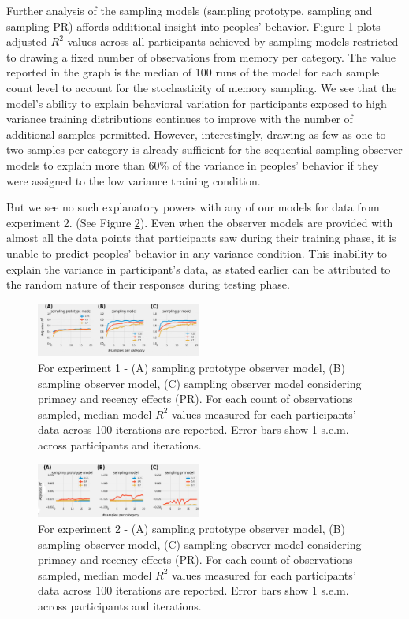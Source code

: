 \documentclass[10pt,letterpaper]{article}
\begin{document}
Further analysis of the sampling models (sampling prototype, sampling and sampling PR) affords additional insight into peoples' behavior. Figure \ref{fig:meta_r2_performance_upd} plots adjusted $R^2$ values across all participants achieved by sampling models restricted to drawing a fixed number of observations from memory per category. The value reported in the graph is the median of 100 runs of the model for each sample count level to account for the stochasticity of memory sampling. We see that the model's ability to explain behavioral variation for participants exposed to high variance training distributions continues to improve with the number of additional samples permitted. However, interestingly, drawing as few as one to two samples per category is already sufficient for the sequential sampling observer models to explain more than 60\% of the variance in peoples' behavior if they were assigned to the low variance training condition.   


But we see no such explanatory powers with any of our models for data from experiment 2. (See Figure \ref{fig:meta_r2_performance_upd2}). Even when the observer models are provided with almost all the data points that participants saw during their training phase, it is unable to predict peoples' behavior in any variance condition. This inability to explain the variance in participant's data, as stated earlier can be attributed to the random nature of their responses during testing phase.

\begin{figure}[h!]
    \centering
    \includegraphics[width=0.48\textwidth]{results/meta_r2_performance_itr_upd.pdf}
    \caption{For experiment 1 - (A) sampling prototype observer model, (B) sampling observer model, (C) sampling observer model considering primacy and recency effects (PR). For each count of observations sampled, median model $R^2$ values measured for each participants' data across 100 iterations are reported. Error bars show 1 s.e.m. across participants and iterations.}
    \label{fig:meta_r2_performance_upd}
\end{figure}

\begin{figure}[h!]
    \centering
    \includegraphics[width=0.48\textwidth]{results/meta_r2_performance_itr_upd_CS.pdf}
    \caption{For experiment 2 - (A) sampling prototype observer model, (B) sampling observer model, (C) sampling observer model considering primacy and recency effects (PR). For each count of observations sampled, median model $R^2$ values measured for each participants' data across 100 iterations are reported. Error bars show 1 s.e.m. across participants and iterations.}
    \label{fig:meta_r2_performance_upd2}
\end{figure}
\end{document}
